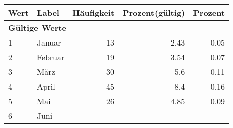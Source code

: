      \begin{longtable}{lXrrr}
     \toprule
     \textbf{Wert} & \textbf{Label} & \textbf{Häufigkeit} & \textbf{Prozent(gültig)} & \textbf{Prozent} \\
     \endhead
     \midrule
     \multicolumn{5}{l}{\textbf{Gültige Werte}}\\

     1 &
     \multicolumn{1}{X}{ Januar   } &


       \num{13} &
       \num[round-mode=places,round-precision=2]{2.43} &
         \num[round-mode=places,round-precision=2]{0.05} \\

     2 &
     \multicolumn{1}{X}{ Februar   } &


       \num{19} &
       \num[round-mode=places,round-precision=2]{3.54} &
         \num[round-mode=places,round-precision=2]{0.07} \\

     3 &
     \multicolumn{1}{X}{ März   } &


       \num{30} &
       \num[round-mode=places,round-precision=2]{5.6} &
         \num[round-mode=places,round-precision=2]{0.11} \\

     4 &
     \multicolumn{1}{X}{ April   } &


       \num{45} &
       \num[round-mode=places,round-precision=2]{8.4} &
         \num[round-mode=places,round-precision=2]{0.16} \\

     5 &
     \multicolumn{1}{X}{ Mai   } &


       \num{26} &
       \num[round-mode=places,round-precision=2]{4.85} &
         \num[round-mode=places,round-precision=2]{0.09} \\

     6 &
     \multicolumn{1}{X}{ Juni   } &



\end{longtable}
